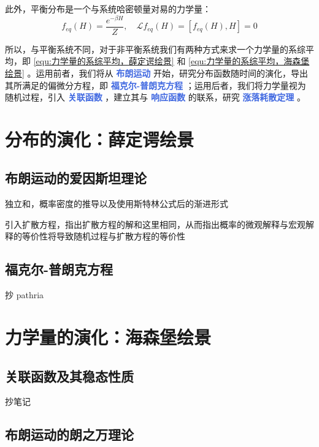 此外，平衡分布是一个与系统哈密顿量对易的力学量：
\begin{equation}\label{equ:平衡分布和哈密顿量对易}
    f_{eq}(H) = \frac{e^{-\beta H}}{Z} ,\quad\mathcal{L}f_{eq}(H) = [f_{eq}(H), H] = 0
\end{equation}

所以，与平衡系统不同，对于非平衡系统我们有两种方式来求一个力学量的系综平均，即 \eqref{equ:力学量的系综平均，薛定谔绘景} 和 \eqref{equ:力学量的系综平均，海森堡绘景} 。运用前者，我们将从 \textcolor{RoyalBlue}{\textbf{\kaishu 布朗运动}} 开始，研究分布函数随时间的演化，导出其所满足的偏微分方程，即 \textcolor{RoyalBlue}{\textbf{\kaishu 福克尔-普朗克方程}} ；运用后者，我们将力学量视为随机过程，引入 \textcolor{RoyalBlue}{\textbf{\kaishu 关联函数}} ，建立其与 \textcolor{RoyalBlue}{\textbf{\kaishu 响应函数}} 的联系，研究 \textcolor{RoyalBlue}{\textbf{\kaishu 涨落耗散定理}} 。

\section{分布的演化：薛定谔绘景}

\subsection{布朗运动的爱因斯坦理论}

独立和，概率密度的推导以及使用斯特林公式后的渐进形式

引入扩散方程，指出扩散方程的解和这里相同，从而指出概率的微观解释与宏观解释的等价性将导致随机过程与扩散方程的等价性

\subsection{福克尔-普朗克方程}

抄 pathria

\section{力学量的演化：海森堡绘景}


\subsection{关联函数及其稳态性质}

抄笔记

\subsection{布朗运动的朗之万理论}

